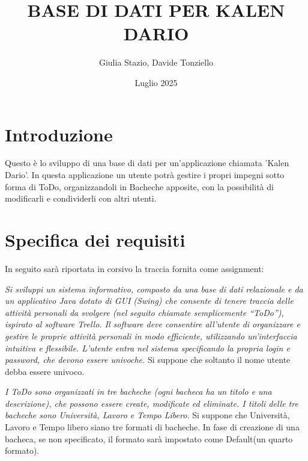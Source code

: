 \documentclass{article}
\title{BASE DI DATI PER KALEN DARIO}
\author{Giulia Stazio, Davide Tonziello}
\date{Luglio 2025}
\begin{document}
	
	\maketitle
	\tableofcontents
	\pagebreak
	
	\section{Introduzione}
	
	Questo è lo sviluppo di una base di dati per un'applicazione chiamata 'Kalen Dario'.
	In questa applicazione un utente potrà gestire i propri impegni sotto forma di ToDo, organizzandoli in Bacheche apposite, con la possibilità di modificarli e condividerli con altri utenti.
	
	\section{Specifica dei requisiti}
	In seguito sarà riportata in corsivo la traccia fornita come assignment: \linebreak
	
	\textit {Si sviluppi un sistema informativo, composto da una base di dati relazionale e da un applicativo Java dotato di GUI (Swing) che consente di tenere traccia delle attività personali da svolgere (nel seguito chiamate semplicemente “ToDo”), ispirato al software Trello.
	Il software deve consentire all'utente di organizzare e gestire le proprie attività personali in modo efficiente, utilizzando un'interfaccia intuitiva e flessibile.
	L’utente entra nel sistema specificando la propria login e password, che devono essere univoche.} \linebreak
	Si suppone che soltanto il nome utente debba essere univoco. \linebreak[2]
	
	\textit{I ToDo sono organizzati in tre bacheche (ogni bacheca ha un titolo e una descrizione), che possono essere create, modificate ed eliminate. I titoli delle tre bacheche sono Università, Lavoro e Tempo Libero.} \linebreak
	Si suppone che Università, Lavoro e Tempo libero siano tre formati di bacheche. In fase di creazione di una bacheca, se non specificato, il formato sarà impostato come Default(un quarto formato). \linebreak[2]
	
\end{document}
